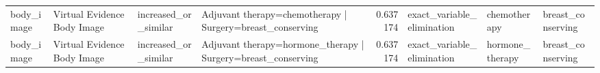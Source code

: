 \begin{table}
\begin{tabular}{llllrlll}
body\_image & Virtual Evidence Body Image & increased\_or\_similar & Adjuvant therapy=chemotherapy | Surgery=breast\_conserving & 0.637174 & exact\_variable\_elimination & chemotherapy & breast\_conserving \\
body\_image & Virtual Evidence Body Image & increased\_or\_similar & Adjuvant therapy=hormone\_therapy | Surgery=breast\_conserving & 0.637174 & exact\_variable\_elimination & hormone\_therapy & breast\_conserving \\
\bottomrule
\end{tabular}
\end{table}
